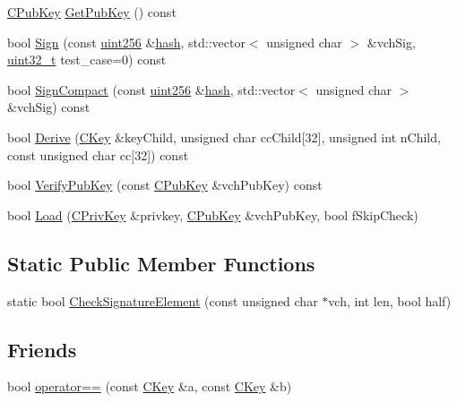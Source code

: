 \begin{DoxyCompactItemize}
\hyperlink{class_c_pub_key}{C\+Pub\+Key} \hyperlink{class_c_key_ae4b61da6ec62f676fe6362ac5fc26aca}{Get\+Pub\+Key} () const 
\item 
bool \hyperlink{class_c_key_a3b161899b4fa79f5a7036d2ccf12ce3a}{Sign} (const \hyperlink{classuint256}{uint256} \&\hyperlink{cache_8cc_a11ecb029164e055f28f4123ce3748862}{hash}, std\+::vector$<$ unsigned char $>$ \&vch\+Sig, \hyperlink{stdint_8h_a435d1572bf3f880d55459d9805097f62}{uint32\+\_\+t} test\+\_\+case=0) const 
\item 
bool \hyperlink{class_c_key_a59afeabf3f63d99dfdbd3722087853a1}{Sign\+Compact} (const \hyperlink{classuint256}{uint256} \&\hyperlink{cache_8cc_a11ecb029164e055f28f4123ce3748862}{hash}, std\+::vector$<$ unsigned char $>$ \&vch\+Sig) const 
\item 
bool \hyperlink{class_c_key_abb0091d4390dcece3c56ea4c1fdd6036}{Derive} (\hyperlink{class_c_key}{C\+Key} \&key\+Child, unsigned char cc\+Child\mbox{[}32\mbox{]}, unsigned int n\+Child, const unsigned char cc\mbox{[}32\mbox{]}) const 
\item 
bool \hyperlink{class_c_key_a3890764f7a2e5d9cdeffb3e102e4545d}{Verify\+Pub\+Key} (const \hyperlink{class_c_pub_key}{C\+Pub\+Key} \&vch\+Pub\+Key) const 
\item 
bool \hyperlink{class_c_key_a141751588f8bfe5f1b6fc27f4e64b63f}{Load} (\hyperlink{key_8h_a1da569b8b6e5b3fa1196cc1b877e7f54}{C\+Priv\+Key} \&privkey, \hyperlink{class_c_pub_key}{C\+Pub\+Key} \&vch\+Pub\+Key, bool f\+Skip\+Check)
\end{DoxyCompactItemize}
\subsection*{Static Public Member Functions}
\begin{DoxyCompactItemize}
\item 
static bool \hyperlink{class_c_key_a625c363d9adfbd4dda22f3a67a898cf4}{Check\+Signature\+Element} (const unsigned char $\ast$vch, int len, bool half)
\end{DoxyCompactItemize}
\subsection*{Friends}
\begin{DoxyCompactItemize}
\item 
bool \hyperlink{class_c_key_a381efd9184dc467e73e690329c70371d}{operator==} (const \hyperlink{class_c_key}{C\+Key} \&a, const \hyperlink{class_c_key}{C\+Key} \&b)
\end{DoxyCompactItemize}


